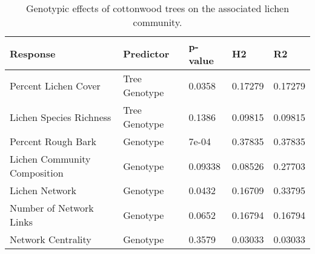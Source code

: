 \begin{table}[ht]
\centering
\begin{tabular}{lllll}
  \hline
Response & Predictor & p-value & H2 & R2 \\ 
  \hline
Percent Lichen Cover & Tree Genotype & 0.0358 & 0.17279 & 0.17279 \\ 
  Lichen Species Richness & Tree Genotype & 0.1386 & 0.09815 & 0.09815 \\ 
  Percent Rough Bark & Genotype & 7e-04 & 0.37835 & 0.37835 \\ 
  Lichen Community Composition & Genotype & 0.09338 & 0.08526 & 0.27703 \\ 
  Lichen Network & Genotype & 0.0432 & 0.16709 & 0.33795 \\ 
  Number of Network Links & Genotype & 0.0652 & 0.16794 & 0.16794 \\ 
  Network Centrality & Genotype & 0.3579 & 0.03033 & 0.03033 \\ 
   \hline
\end{tabular}
\caption{Genotypic effects of cottonwood trees on the associated lichen community.} 
\label{tab:h2_table}
\end{table}
